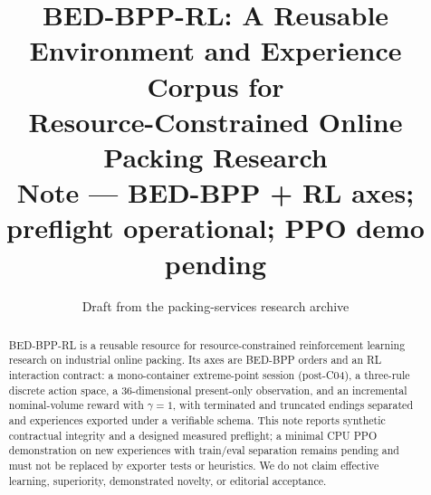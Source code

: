 \documentclass[11pt,a4paper]{article}
\title{BED-BPP-RL: A Reusable Environment and Experience Corpus for\\
Resource-Constrained Online Packing Research\\
\large Note --- BED-BPP + RL axes; preflight operational; PPO demo pending}
\author{Draft from the packing-services research archive}
\date{}
\begin{document}
\maketitle

\begin{abstract}
BED-BPP-RL is a reusable resource for resource-constrained reinforcement
learning research on industrial online packing. Its axes are BED-BPP orders and
an RL interaction contract: a mono-container extreme-point session (post-C04),
a three-rule discrete action space, a 36-dimensional present-only observation,
and an incremental nominal-volume reward with \(\gamma=1\), with terminated and
truncated endings separated and experiences exported under a verifiable schema.
This note reports synthetic contractual integrity and a designed measured
preflight; a minimal CPU PPO demonstration on new experiences with train/eval
separation remains pending and must not be replaced by exporter tests or
heuristics. We do not claim effective learning, superiority, demonstrated
novelty, or editorial acceptance.
\end{abstract}











\appendix




\end{document}

